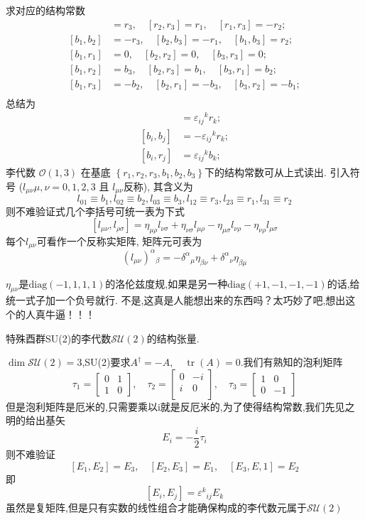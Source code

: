 \documentclass[../main.tex]{subfiles}
\begin{document}
 求对应的结构常数
 \begin{align*}
     [r_1,r_2] &= r_3,\quad
     [r_2,r_3] = r_1,\quad
     [r_1,r_3] = -r_2; \\
     [b_1,b_2] &= -r_3,\quad
     [b_2,b_3] = -r_1,\quad
     [b_1,b_3] = r_2;\\
     [b_1,r_1] &= 0,\quad
     [b_2,r_2] = 0,\quad
     [b_3,r_3] = 0 ;\\
     [b_1,r_2] &= b_3,\quad
     [b_2,r_3] = b_1 ,\quad
     [b_3,r_1] = b_2;\\    
     [b_1,r_3] &= -b_2,\quad
     [b_2,r_1] = -b_3,\quad
     [b_3,r_2] = -b_1;\\
 \end{align*}  
 总结为
 \begin{align*}
     [r_i,r_j] &= \varepsilon_{ij}{}^{k}r_k;\\
     [b_i,b_j] &= -\varepsilon_{ij}{}^{k}r_k;\\
     [b_i,r_j] &= \varepsilon_{ij}{}^{k}b_k;
 \end{align*} 
 李代数 $\mathscr{O}(1,3)$ 在基底 $\left\{r_{1}, r_{2}, r_{3}, b_{1}, b_{2}, b_{3}\right\} $下的结构常数可从上式读出.
 引入符号 ($l_{\mu \nu}\mu, \nu=0,1,2,3$ 且 $l_{\mu \nu}$反称), 其含义为
 $$l_{01} \equiv b_{1}, l_{02} \equiv b_{2}, l_{03} \equiv b_{3}, l_{12} \equiv r_{3}, l_{23} \equiv r_{1}, l_{31} \equiv r_{2}$$
 则不难验证式几个李括号可统一表为下式
 $$\left[l_{\mu \nu}, l_{\rho \sigma}\right]=\eta_{\mu \rho} l_{\nu \sigma}+\eta_{\nu \sigma} l_{\mu \rho}-\eta_{\mu \sigma} l_{\nu \rho}-\eta_{\nu \rho} l_{\mu \sigma}$$
 每个$l_{\mu \nu}$可看作一个反称实矩阵, 矩阵元可表为$$\left(l_{\mu \nu}\right)^{\alpha}{ }_{\beta}=-\delta^{\alpha}{ }_{\mu} \eta_{\beta \nu}+\delta^{\alpha}{ }_{\nu} \eta_{\beta \mu}$$
 \begin{note}
 $\eta_{\mu\nu}$是$\text{diag}(-1,1,1,1)$的洛伦兹度规,如果是另一种$\text{diag}(+1,-1,-1,-1)$的话,给统一式子加一个负号就行.
 不是,这真是人能想出来的东西吗？太巧妙了吧,想出这个的人真牛逼！！！
 \end{note}
 \begin{example}
     特殊酉群SU(2)的李代数$\mathscr{SU}(2)$的结构张量.
 \end{example}
 $\dim\mathscr{SU}(2) = 3$,SU(2)要求$A^\dagger = -A,\quad \operatorname{tr}(A) = 0$.我们有熟知的泡利矩阵
 $$\tau_1 = \begin{bmatrix}
     0&1\\
     1&0
 \end{bmatrix},\quad \tau_2=\begin{bmatrix}
     0&-i\\
     i&0\\
 \end{bmatrix},\quad \tau_3 = \begin{bmatrix}
     1&0\\
     0&-1
 \end{bmatrix}$$但是泡利矩阵是厄米的,只需要乘以i就是反厄米的,为了使得结构常数,我们先见之明的给出基矢
 $$E_i = -\frac{i}{2}\tau_i$$
 则不难验证$$[E_1,E_2] = E_3,\quad [E_2,E_3] = E_1, \quad [E_3,E,1] = E_2$$
 即$$[E_i,E_j] = \varepsilon^k{}_{ij}E_k$$
 虽然是复矩阵,但是只有实数的线性组合才能确保构成的李代数元属于$\mathscr{SU}(2)$
\end{document}
